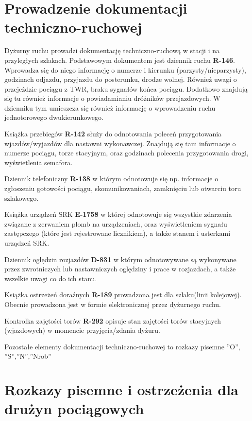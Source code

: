 \chapter{Prowadzenie dokumentacji techniczno-ruchowej}

Dyżurny ruchu prowadzi dokumentację techniczno-ruchową w stacji i na przyległych szlakach. 
Podstawowym dokumentem jest dziennik ruchu \textbf{R-146}. Wprowadza się do niego informację o numerze i kierunku (parzysty/nieparzysty), godzinach odjazdu, przyjazdu do posterunku, drodze wolnej. Również uwagi o przejeździe pociągu z TWR, braku sygnałów końca pociągu. Dodatkowo znajdują się tu również informacje o powiadamianiu dróżników przejazdowych. W dzienniku tym umieszcza się również informację o wprowadzeniu ruchu jednotorowego dwukierunkowego.

Książka przebiegów \textbf{R-142} służy do odnotowania poleceń przygotowania wjazdów/wyjazdów dla nastawni wykonawczej. Znajdują się tam informacje o numerze pociągu, torze stacyjnym, oraz godzinach polecenia przygotowania drogi, wyświetlenia semafora.

Dziennik telefoniczny \textbf{R-138} w którym odnotowuje się np. informacje o zgłoszeniu gotowości pociągu, skomunikowaniach, zamknięciu lub otwarciu toru szlakowego. 

Książka urządzeń SRK \textbf{E-1758} w której odnotowuje się wszystkie zdarzenia związane z zerwaniem plomb na urządzeniach, oraz wyświetleniem sygnału zastępczego (które jest rejestrowane licznikiem), a także stanem i usterkami urządzeń SRK. 

Dziennik oględzin rozjazdów \textbf{D-831} w którym odnotowywane są wykonywane przez zwrotniczych lub nastawniczych oględziny i prace w rozjazdach, a także wszelkie uwagi co do ich stanu.

Książka ostrzeżeń doraźnych \textbf{R-189} prowadzona jest dla szlaku(linii kolejowej). Obecnie prowadzona jest w formie elektronicznej przez dyżurnego ruchu.

Kontrolka zajętości torów \textbf{R-292} opisuje stan zajętości torów stacyjnych (wjazdowych) w momencie przyjęcia/zdania dyżuru.

Pozostałe elementy dokumentacji techniczno-ruchowej to rozkazy pisemne ''O'', ''S'',''N'',''Nrob''

\chapter{Rozkazy pisemne i ostrzeżenia dla drużyn pociągowych}

